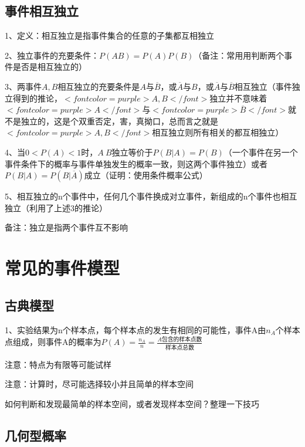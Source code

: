 \subsection{事件相互独立}

1、定义：相互独立是指事件集合的任意的子集都互相独立

2、独立事件的充要条件：$ P(AB)=P(A)P(B) $（备注：常用用判断两个事件是否是相互独立的）

3、两事件$ A,B $相互独立的充要条件是$ A $与$ \overline B $，或$ \overline A $与$ B $，或$ \overline A $与$ \overline B $相互独立（事件独立得到的推论，$ <font color=purple>A,B</font> $独立并不意味着$ <font color=purple>A</font> $与$ <font color=purple>\overline B</font> $就不是独立的，这是个双重否定，害，真拗口，总而言之就是$ <font color=purple>A,B</font> $相互独立则所有相关的都互相独立）

4、当$ 0<P(A)<1 $时，$ A \  B $独立等价于$ P(B|A)=P(B) $（一个事件在另一个事件条件下的概率与事件单独发生的概率一致，则这两个事件独立）或者$ P(B|A)=P(B|\overline A) $成立（证明：使用条件概率公式）

5、相互独立的n个事件中，任何几个事件换成对立事件，新组成的n个事件也相互独立（利用了上述3的推论）

备注：独立是指两个事件互不影响

\section{常见的事件模型}



\subsection{古典模型}

1、实验结果为n个样本点，每个样本点的发生有相同的可能性，事件A由$ n_A $个样本点组成，则事件A的概率为$ P(A) = \frac{n_A}{n} = \frac{A包含的样本点数}{样本点总数} $

注意：特点为有限等可能试样

注意：计算时，尽可能选择较小并且简单的样本空间

如何判断和发现最简单的样本空间，或者发现样本空间？整理一下技巧



\subsection{几何型概率}

